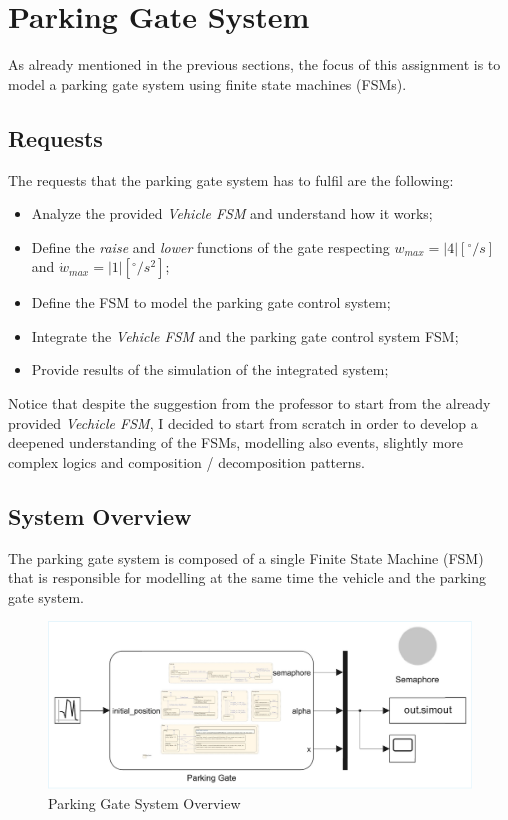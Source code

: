 \section{Parking Gate System}
\label{sec:parking_gate_system}

As already mentioned in the previous sections, the focus of this assignment is to model a parking gate system using finite state machines (FSMs).

\subsection{Requests}
\label{subsec:requests}

The requests that the parking gate system has to fulfil are the following:

\begin{itemize}
    \item Analyze the provided \textit{Vehicle FSM} and understand how it works;
    \item Define the \textit{raise} and \textit{lower} functions of the gate respecting $w_{max} = |4| [^\circ / s]$ and $\dot{w}_{max} = |1| [^\circ / s^2]$;
    \item Define the FSM to model the parking gate control system;
    \item Integrate the \textit{Vehicle FSM} and the parking gate control system FSM;
    \item Provide results of the simulation of the integrated system;
\end{itemize}

Notice that despite the suggestion from the professor to start from the already provided \textit{Vechicle FSM}, I decided to start from scratch in order to develop a deepened understanding of the FSMs, modelling also events, slightly more complex logics and composition / decomposition patterns.



\subsection{System Overview}
\label{subsec:system_overview}

The parking gate system is composed of a single Finite State Machine (FSM) that is responsible for modelling at the same time the vehicle and the parking gate system.

\begin{figure}[H]
    \centering
    \includegraphics[width=1.0\textwidth]{./img/MATLAB/parking_gate_system_overview.pdf}
    \caption{Parking Gate System Overview}
    \label{fig:parking_gate_system}
\end{figure}

